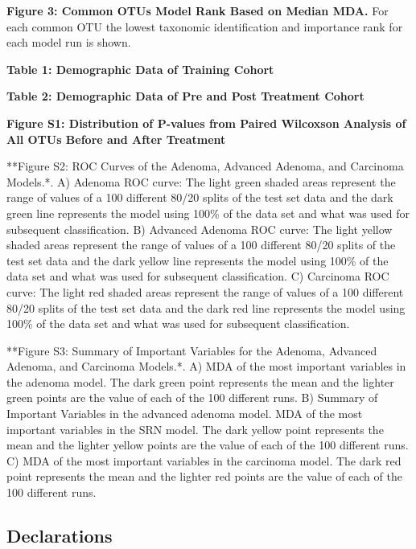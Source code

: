 \documentclass[12pt,]{article}
\begin{document}
\textbf{Figure 3: Common OTUs Model Rank Based on Median MDA.} For each
common OTU the lowest taxonomic identification and importance rank for
each model run is shown.

\newpage

\textbf{Table 1: Demographic Data of Training Cohort}

\textbf{Table 2: Demographic Data of Pre and Post Treatment Cohort}

\newpage

\textbf{Figure S1: Distribution of P-values from Paired Wilcoxson
Analysis of All OTUs Before and After Treatment}

**Figure S2: ROC Curves of the Adenoma, Advanced Adenoma, and Carcinoma
Models.*. A) Adenoma ROC curve: The light green shaded areas represent
the range of values of a 100 different 80/20 splits of the test set data
and the dark green line represents the model using 100\% of the data set
and what was used for subsequent classification. B) Advanced Adenoma ROC
curve: The light yellow shaded areas represent the range of values of a
100 different 80/20 splits of the test set data and the dark yellow line
represents the model using 100\% of the data set and what was used for
subsequent classification. C) Carcinoma ROC curve: The light red shaded
areas represent the range of values of a 100 different 80/20 splits of
the test set data and the dark red line represents the model using 100\%
of the data set and what was used for subsequent classification.

**Figure S3: Summary of Important Variables for the Adenoma, Advanced
Adenoma, and Carcinoma Models.*. A) MDA of the most important variables
in the adenoma model. The dark green point represents the mean and the
lighter green points are the value of each of the 100 different runs. B)
Summary of Important Variables in the advanced adenoma model. MDA of the
most important variables in the SRN model. The dark yellow point
represents the mean and the lighter yellow points are the value of each
of the 100 different runs. C) MDA of the most important variables in the
carcinoma model. The dark red point represents the mean and the lighter
red points are the value of each of the 100 different runs.

\newpage

\subsection{Declarations}\label{declarations}
\end{document}
